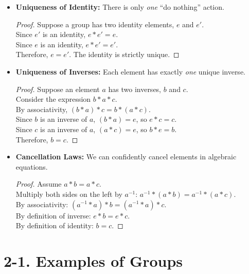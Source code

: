 \documentclass[12pt]{article}
\begin{document}
\begin{itemize}
    \item \textbf{Uniqueness of Identity:} There is only \textit{one} ``do nothing'' action.
          \begin{proof}
              Suppose a group has two identity elements, $e$ and $e'$. \\
              Since $e'$ is an identity, $e * e' = e$. \\
              Since $e$ is an identity, $e * e' = e'$. \\
              Therefore, $e = e'$. The identity is strictly unique.
          \end{proof}

    \item \textbf{Uniqueness of Inverses:} Each element has exactly \textit{one} unique inverse.
          \begin{proof}
              Suppose an element $a$ has two inverses, $b$ and $c$. \\
              Consider the expression $b * a * c$. \\
              By associativity, $(b * a) * c = b * (a * c)$. \\
              Since $b$ is an inverse of $a$, $(b * a) = e$, so $e * c = c$. \\
              Since $c$ is an inverse of $a$, $(a * c) = e$, so $b * e = b$. \\
              Therefore, $b = c$.
          \end{proof}

    \item \textbf{Cancellation Laws:} We can confidently cancel elements in algebraic equations.
          \begin{proof}
              Assume $a * b = a * c$. \\
              Multiply both sides on the left by $a^{-1}$: $a^{-1} * (a * b) = a^{-1} * (a * c)$. \\
              By associativity: $(a^{-1} * a) * b = (a^{-1} * a) * c$. \\
              By definition of inverse: $e * b = e * c$. \\
              By definition of identity: $b = c$.
          \end{proof}
\end{itemize}

\section*{2-1. Examples of Groups}
\end{document}
